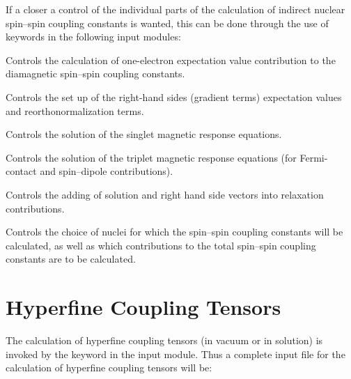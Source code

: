 If a closer a control of the individual parts of the calculation of
indirect nuclear spin--spin coupling constants is wanted, this can be
done through the use of keywords in the following input modules:

\begin{list}{}{\itemsep 0.10cm \parsep 0.0cm}
\item[\Sec{EXPECT}] Controls the calculation of one-electron
expectation value contribution to the diamagnetic spin--spin coupling
constants. 
\item[\Sec{GETSGY}] Controls the set up of the right-hand sides
(gradient terms) 
expectation values and reorthonormalization terms.
\item[\Sec{LINRES}] Controls the solution of the singlet magnetic
response equations.
\item[\Sec{TRPRSP}] Controls the solution of the triplet magnetic
response equations (for Fermi-contact and spin--dipole contributions).
\item[\Sec{RELAX}] Controls the adding of solution and right hand
side vectors into relaxation contributions.
\item[\Sec{SPIN-S}] Controls the choice of nuclei for which the
spin--spin coupling constants will be calculated, as well as which
contributions to the total spin--spin coupling constants are to be
calculated.
\end{list}

\section{Hyperfine Coupling Tensors}

\begin{center}
\end{center}

	The calculation of hyperfine coupling tensors (in vacuum or in 
solution) is invoked by the keyword  in the 
input module. Thus a complete input file for the calculation of
hyperfine coupling tensors will be:

